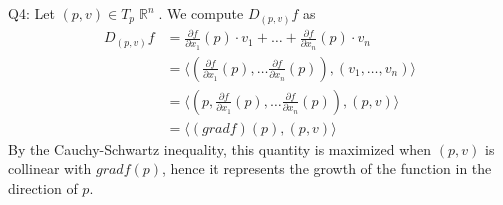 \documentclass[letterpaper]{article}
\DeclareMathOperator{\R}{\mathbb{R}}
\newcommand{\lan}{\langle}
\newcommand{\ran}{\rangle}
\newcommand{\inn}[1]{\lan#1\ran}
\begin{document}
\noindent Q4: Let $(p,v)\in T_p\R^n$. We compute $D_{(p,v)}f$ as 
\begin{align*}
D_{(p,v)}f & = \frac{\partial f}{\partial x_1}(p) \cdot v_1 + \dots + \frac{\partial f}{\partial x_n}(p) \cdot v_n
\\ & = \inn{(\frac{\partial f}{\partial x_1}(p), \dots \frac{\partial f}{\partial x_n}(p)),(v_1,\dots ,v_n)} \tag{definition of inner product}
\\ & = \inn{(p,\frac{\partial f}{\partial x_1}(p), \dots \frac{\partial f}{\partial x_n}(p)),(p,v)} \tag{by definition of inner product on a tangent space}
\\ & = \inn{(grad f)(p),(p,v)} \tag{by definition of grad f}
\end{align*} By the Cauchy-Schwartz inequality, this quantity is maximized when $(p,v)$ is collinear with $grad f(p)$, hence it represents the growth of the function in the direction of $p$. 
\end{document}
